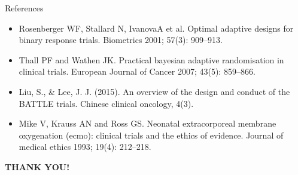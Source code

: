 \documentclass[12pt,t]{beamer}
\newcommand{\bi}{\begin{itemize}}
\newcommand{\ei}{\end{itemize}}
\begin{document}
\begin{frame}{References}
\bi
\itemsep12pt
\item Rosenberger WF, Stallard N, IvanovaA et al. Optimal adaptive designs for binary response trials. Biometrics 2001; 57(3): 909–913.

\item Thall PF and Wathen JK. Practical bayesian adaptive randomisation in clinical trials. European Journal of Cancer 2007; 43(5): 859–866.

\item Liu, S., \& Lee, J. J. (2015). An overview of the design and conduct of the BATTLE trials. Chinese clinical oncology, 4(3).

\item Mike V, Krauss AN and Ross GS. Neonatal extracorporeal membrane oxygenation (ecmo): clinical trials and the ethics of evidence. Journal of medical ethics 1993; 19(4): 212–218.
\ei
\end{frame}

\begin{frame}
\vspace{72pt}
\begin {center}
\textbf{THANK YOU!}
\end{center}
\end{frame}
\end{document}
